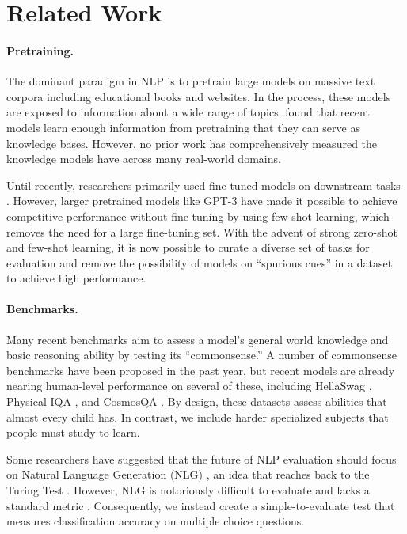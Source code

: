 \documentclass{article} \usepackage{iclr2021_conference, times}
\begin{document}
 \section{Related Work}
\paragraph{Pretraining.} 
The dominant paradigm in NLP is to pretrain large models on massive text corpora including educational books and websites. In the process, these models are exposed to information about a wide range of topics.
\citet{petroni2019languagemodelsasknowledgebase} found that recent models learn enough information from pretraining that they can serve as knowledge bases.
However, no prior work has comprehensively measured the knowledge models have across many real-world domains. 

Until recently, researchers primarily used fine-tuned models on downstream tasks \citep{BERTDevlin2019}. However, larger pretrained models like GPT-3 \citep{brown2020gpt3} have made it possible to achieve competitive performance without fine-tuning by using few-shot learning, which removes the need for a large fine-tuning set. With the advent of strong zero-shot and few-shot learning, it is now possible to curate a diverse set of tasks for evaluation and remove the possibility of models on ``spurious cues'' \citep{geirhos2020shortcut,Hendrycks2019NaturalAE} in a dataset to achieve high performance.

\paragraph{Benchmarks.} 
Many recent benchmarks aim to assess a model's general world knowledge and basic reasoning ability by testing its ``commonsense.'' A number of commonsense benchmarks have been proposed in the past year, but recent models are already nearing human-level performance on several of these, including HellaSwag \citep{zellers2019hellaswag}, Physical IQA \citep{bisk2019physicaliqa}, and CosmosQA \citep{huang2019cosmosqa}. By design, these datasets assess abilities that almost every child has. In contrast, we include harder specialized subjects that people must study to learn. 

Some researchers have suggested that the future of NLP evaluation should focus on Natural Language Generation (NLG) \citep{zellers2020turingadvice}, an idea that reaches back to the Turing Test \citep{Turing1990TuringTest}. However, NLG is notoriously difficult to evaluate and lacks a standard metric \citep{Sai2020NLGSurvey}. Consequently, we instead create a simple-to-evaluate test that measures classification accuracy on multiple choice questions.
\end{document}
